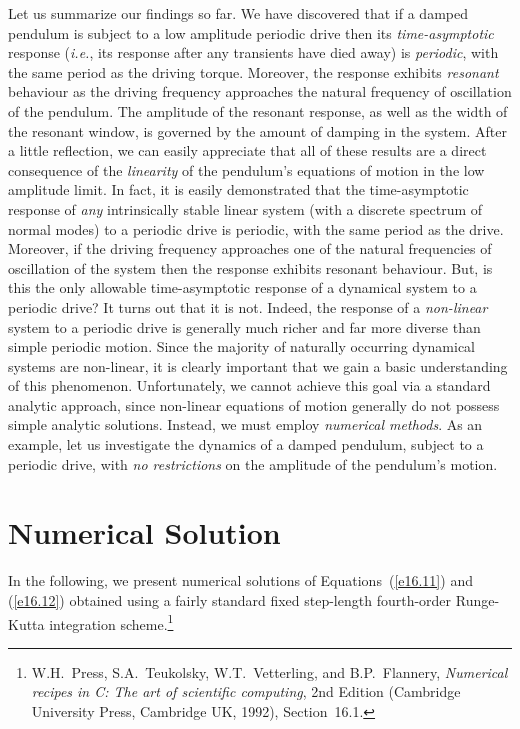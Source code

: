 Let us summarize our findings so far. We have discovered that if a damped pendulum is
subject to a low amplitude periodic drive then its {\em time-asymptotic}\/ response ({\em i.e.},
its response after any transients have died away) is {\em periodic}, with the same period
as the driving torque. Moreover, the response exhibits {\em resonant}\/ behaviour as the driving
frequency approaches the natural frequency of oscillation of the pendulum. The amplitude
of the resonant response, as well as the width of the resonant window, is governed by the
amount of damping in the system. After a little reflection, we can easily appreciate that
all of these results are a direct consequence of the {\em linearity}\/ of the pendulum's
equations of  motion in the low amplitude limit. In fact, 
it is easily demonstrated that the time-asymptotic response of {\em any} intrinsically
stable linear system (with a discrete spectrum of normal modes) to a periodic drive is periodic,
with the same period as the drive. Moreover, if the driving frequency approaches
one of the natural frequencies of oscillation of the system then the response exhibits
resonant behaviour. But, is this the only allowable time-asymptotic response of a dynamical system to a
periodic drive? It turns out that it is not.
Indeed, the response of
a {\em non-linear}\/ system to a periodic drive is generally much richer  and
far more diverse than simple periodic motion. Since the majority of naturally
occurring dynamical systems are non-linear, it is clearly important that we gain a
basic understanding of this phenomenon. Unfortunately, we cannot achieve this goal via
a standard analytic approach, since non-linear equations of motion generally do not possess
simple analytic solutions. Instead, we must employ {\em numerical methods}. As an example, let us
investigate the dynamics of a damped pendulum, subject to a periodic drive, with {\em no
restrictions}\/ on the amplitude of the pendulum's motion.

\section{Numerical Solution}
In the following, we present numerical solutions of Equations~(\ref{e16.11}) and (\ref{e16.12})
obtained using a fairly standard fixed step-length fourth-order
Runge-Kutta integration scheme.\footnote{W.H.~Press, S.A.~Teukolsky,
W.T.~Vetterling, and B.P.~Flannery, {\em Numerical recipes in C: The
art of scientific computing}, 2nd Edition (Cambridge University Press,
Cambridge UK, 1992), Section~16.1.}

